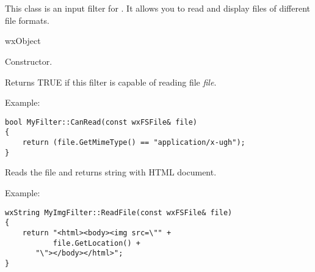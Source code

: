 %
%

\section{}\label{wxhtmlfilter}

This class is an input filter for .
It allows you to read and display files of different file formats.


wxObject




\label{wxhtmlfilterwxhtmlfilter}


Constructor.

\label{wxhtmlfiltercanread}


Returns TRUE if this filter is capable of reading file {\it file}.

Example:

\begin{verbatim}
bool MyFilter::CanRead(const wxFSFile& file)
{
    return (file.GetMimeType() == "application/x-ugh");
}
\end{verbatim}

\label{wxhtmlfilterreadfile}


Reads the file and returns string with HTML document.

Example:

\begin{verbatim}
wxString MyImgFilter::ReadFile(const wxFSFile& file)
{
    return "<html><body><img src=\"" +
           file.GetLocation() +
	   "\"></body></html>";
}
\end{verbatim}

